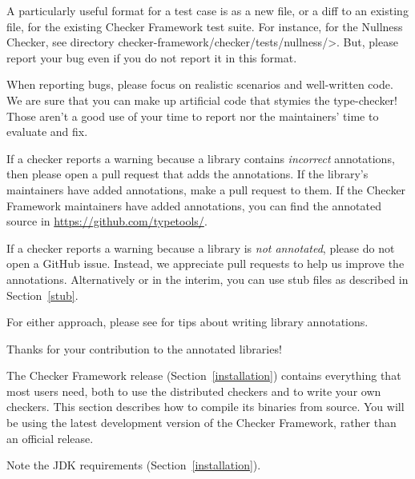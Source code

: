 A particularly useful format for a test case is as a new file, or a diff to
an existing file, for the existing Checker Framework test suite.  For
instance, for the Nullness
Checker, see directory \<checker-framework/checker/tests/nullness/>.
But, please report your bug even if you do not report it in this format.

When reporting bugs, please focus on realistic scenarios and well-written
code.  We are sure that you can make up artificial code that stymies the
type-checker!  Those aren't a good use of your time to report nor the
maintainers' time to evaluate and fix.



If a checker reports a warning because a library contains \emph{incorrect} annotations,
then please open a pull request that adds the annotations.  If the
library's maintainers have added annotations, make a pull request to them.
If the Checker Framework maintainers have added annotations,
you can find the annotated source in \url{https://github.com/typetools/}.

If a checker reports a warning because a library is \emph{not
annotated}, please do not open a GitHub issue.
Instead, we appreciate pull requests to help us improve the annotations.
Alternatively or in the interim, you can use stub files as described in
Section~\ref{stub}.

For either approach, please see  for
tips about writing library annotations.

Thanks for your contribution to the annotated libraries!



The Checker Framework release (Section~\ref{installation}) contains
everything that most users need, both to use the distributed checkers and
to write your own checkers.  This section describes how to compile its
binaries from source.  You will be using the latest development version of
the Checker Framework, rather than an official release.


Note the JDK requirements (Section~\ref{installation}).



